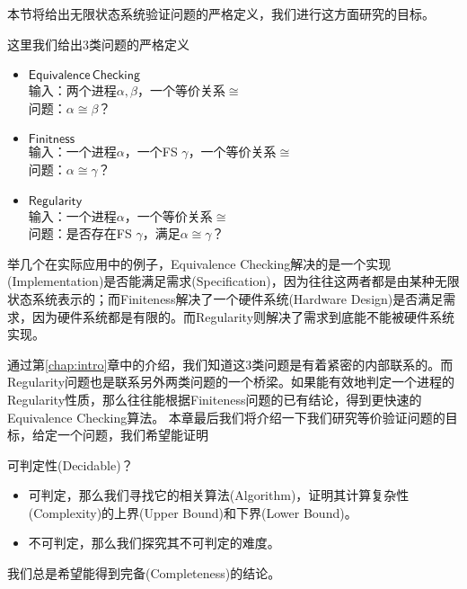 本节将给出无限状态系统验证问题的严格定义，我们进行这方面研究的目标。
\begin{defn}[问题定义]\label{def:prob}
这里我们给出3类问题的严格定义
\begin{itemize}	
	\item $\mathsf{Equivalence\,Checking}$\\
	输入：两个进程$\alpha,\beta$，一个等价关系$\cong$\\
	问题：$\alpha\cong\beta$？	
	\item $\mathsf{Finitness}$\\
	输入：一个进程$\alpha$，一个FS $\gamma$，一个等价关系$\cong$\\
	问题：$\alpha\cong\gamma$？
	\item $\mathsf{Regularity}$\\
	输入：一个进程$\alpha$，一个等价关系$\cong$\\
	问题：是否存在FS $\gamma$，满足$\alpha\cong\gamma$？
\end{itemize}
\end{defn}

举几个在实际应用中的例子，Equivalence Checking解决的是一个实现(Implementation)是否能满足需求(Specification)，因为往往这两者都是由某种无限状态系统表示的；而Finiteness解决了一个硬件系统(Hardware Design)是否满足需求，因为硬件系统都是有限的。而Regularity则解决了需求到底能不能被硬件系统实现。

通过第\ref{chap:intro}章中的介绍，我们知道这3类问题是有着紧密的内部联系的。而Regularity问题也是联系另外两类问题的一个桥梁。如果能有效地判定一个进程的Regularity性质，那么往往能根据Finiteness问题的已有结论，得到更快速的Equivalence Checking算法。
本章最后我们将介绍一下我们研究等价验证问题的目标，给定一个问题，我们希望能证明
	 
可判定性(Decidable)？
	\begin{itemize}
		\item 可判定，那么我们寻找它的相关算法(Algorithm)，证明其计算复杂性(Complexity)的上界(Upper Bound)和下界(Lower Bound)。
		\item 不可判定，那么我们探究其不可判定的难度。
	\end{itemize}
我们总是希望能得到完备(Completeness)的结论。


